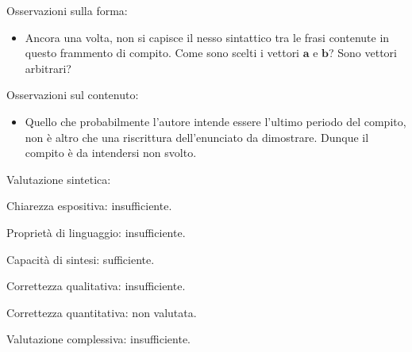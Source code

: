 \documentclass[12pt]{article}
\begin{document}
Osservazioni sulla forma:
\begin{itemize}
\item Ancora una volta, non si capisce il nesso sintattico tra le frasi contenute in questo frammento di compito. Come sono scelti i vettori $\mathbf a$ e $\mathbf b$? Sono vettori arbitrari?
\end{itemize}

Osservazioni sul contenuto:

\begin{itemize}
 \item Quello che probabilmente l'autore intende essere l'ultimo periodo del compito, non \`e altro che una riscrittura dell'enunciato da dimostrare. Dunque il compito \`e da intendersi non svolto.
 \end{itemize}

 Valutazione sintetica:

 Chiarezza espositiva: insufficiente.

 Propriet\`a di linguaggio: insufficiente.

 Capacit\`a di sintesi: sufficiente.

 Correttezza qualitativa: insufficiente.

 Correttezza quantitativa: non valutata.

 Valutazione complessiva: insufficiente.
\end{document}
